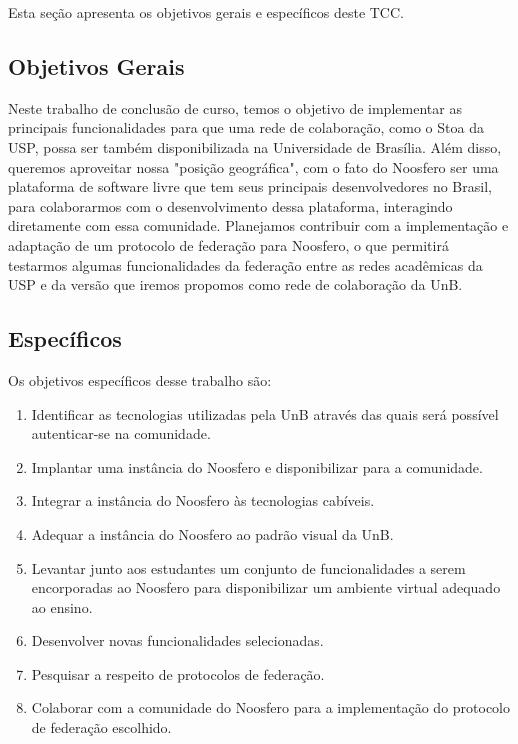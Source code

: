 Esta seção apresenta os objetivos gerais e específicos deste TCC.

\subsection{Objetivos Gerais}

Neste trabalho de conclusão de curso, temos o objetivo de implementar as
principais funcionalidades para que uma rede de colaboração, como o Stoa da USP,
possa ser também disponibilizada na Universidade de Brasília. Além disso, queremos
aproveitar nossa "posição geográfica", com o fato do Noosfero ser uma plataforma
de software livre que tem seus principais desenvolvedores no Brasil, para
colaborarmos com o desenvolvimento dessa plataforma, interagindo diretamente com
essa comunidade. Planejamos contribuir com a implementação e adaptação de
um protocolo de federação para Noosfero, o que permitirá testarmos algumas
funcionalidades da federação entre as redes acadêmicas da USP e da versão que
iremos propomos como rede de colaboração da UnB.


\subsection{Específicos}

Os objetivos específicos desse trabalho são:

\begin{enumerate}
	
\item Identificar as tecnologias utilizadas pela UnB através das quais será
possível autenticar-se na comunidade.
\item Implantar uma instância do Noosfero e disponibilizar para a comunidade.
\item Integrar a instância do Noosfero às tecnologias cabíveis.
\item Adequar a instância do Noosfero ao padrão visual da UnB.
\item Levantar junto aos estudantes um conjunto de funcionalidades a serem
encorporadas ao Noosfero para disponibilizar um ambiente virtual adequado ao
ensino.
\item Desenvolver novas funcionalidades selecionadas.
\item Pesquisar a respeito de protocolos de federação.
\item Colaborar com a comunidade do Noosfero para a implementação do protocolo
de federação escolhido.

\end{enumerate}

